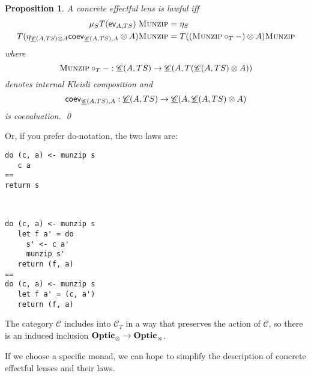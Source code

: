 \documentclass[11pt,letterpaper]{article}
\theoremstyle{plain}
\newtheorem{proposition}[theorem]{Proposition}
\theoremstyle{definition}
\newtheorem{definition}[theorem]{Definition}
\newcommand{\C}{\mathscr{C}}
\newcommand{\homC}{\underline{\C}}
\newcommand{\Optic}{\mathbf{Optic}}
\newcommand{\munzip}{\textsc{Munzip}}
\begin{document}
\begin{proposition}
A concrete effectful lens is lawful iff
  \begin{align*}
    \mu_S T(\ev_{A, TS}) \; \munzip &= \eta_S \\
    T(\eta_{\homC(A, TS) \otimes A}\coev_{\homC(A, TS), A} \otimes A)\munzip &= T((\munzip \circ_T -) \otimes A)\munzip
  \end{align*}
  where \[ \munzip \circ_T - : \homC(A, TS) \to \homC(A, T(\homC(A, TS) \otimes A)) \] denotes internal Kleisli composition and \[\coev_{\homC(A, TS), A} : \homC(A, TS) \to \homC(A, \homC(A, TS) \otimes A) \] is coevaluation. \qed
\end{proposition}
  Or, if you prefer do-notation, the two laws are:
\begin{multicols}{2}
\begin{verbatim}
do (c, a) <- munzip s
   c a
==
return s
\end{verbatim}
~\columnbreak
\begin{verbatim}
do (c, a) <- munzip s
   let f a' = do
     s' <- c a'
     munzip s'
   return (f, a)
==
do (c, a) <- munzip s
   let f a' = (c, a')
   return (f, a)
\end{verbatim}
\end{multicols}

The category $\C$ includes into $\C_T$ in a way that preserves the action of $\C$, so there is an induced inclusion $\Optic_\otimes \to \Optic_\monact$.

If we choose a specific monad, we can hope to simplify the description of concrete effectful lenses and their laws.

%
%
%
\end{document}
